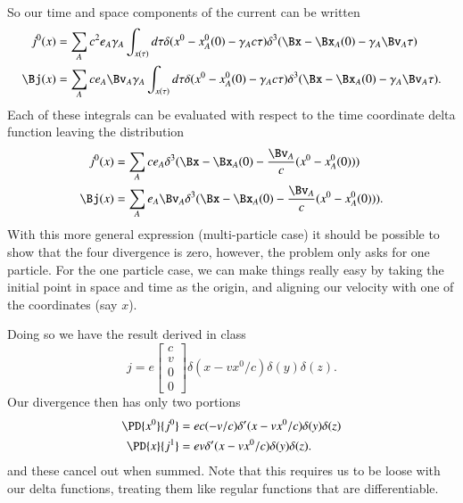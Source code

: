 {\begin{equation}
\begin{aligned}
\end{aligned}
\end{equation}
%
So our time and space components of the current can be written
%
\begin{equation}\label{eqn:relElectroDynProblemSet3:2000}
\begin{aligned}
j^0(x) &= \sum_A c^2 e_A \gamma_A \int_{x(\tau)} d\tau
\delta(x^0 - x_A^0(0) - \gamma_A c \tau)
\delta^3(\Bx - \Bx_A(0) - \gamma_A \Bv_A \tau) \\
\Bj(x) &= \sum_A c e_A \Bv_A \gamma_A \int_{x(\tau)} d\tau
\delta(x^0 - x_A^0(0) - \gamma_A c \tau)
\delta^3(\Bx - \Bx_A(0) - \gamma_A \Bv_A \tau).
\end{aligned}
\end{equation}
%
Each of these integrals can be evaluated with respect to the time coordinate delta function leaving the distribution
%
\begin{equation}\label{eqn:relElectroDynProblemSet3:2020}
\begin{aligned}
j^0(x) &= \sum_A c e_A
\delta^3(\Bx - \Bx_A(0) - \frac{\Bv_A}{c} (x^0 - x_A^0(0))) \\
\Bj(x) &= \sum_A e_A \Bv_A
\delta^3(\Bx - \Bx_A(0) - \frac{\Bv_A}{c} (x^0 - x_A^0(0))).
\end{aligned}
\end{equation}
%
With this more general expression (multi-particle case) it should be possible to show that the four divergence is zero, however, the problem only asks for one particle.  For the one particle case, we can make things really easy by taking the initial point in space and time as the origin, and aligning our velocity with one of the coordinates (say \(x\)).

Doing so we have the result derived in class
%
\begin{equation}\label{eqn:relElectroDynProblemSet3:2040}
j = e
\begin{bmatrix}
c \\
v \\
0 \\
0
\end{bmatrix}
\delta(x - v x^0/c)
\delta(y)
\delta(z).
\end{equation}
%
Our divergence then has only two portions
%
\begin{equation}\label{eqn:relElectroDynProblemSet3:2060}
\begin{aligned}
\PD{x^0}{j^0} &= e c (-v/c) \delta'(x - v x^0/c) \delta(y) \delta(z) \\
\PD{x}{j^1} &= e v \delta'(x - v x^0/c) \delta(y) \delta(z).
\end{aligned}
\end{equation}
%
and these cancel out when summed.  Note that this requires us to be loose with our delta functions, treating them like regular functions that are differentiable.

}
